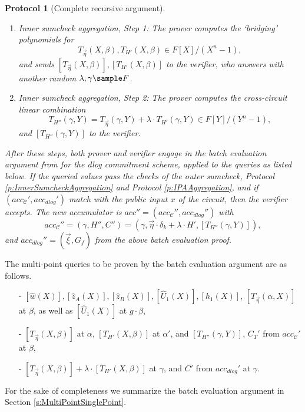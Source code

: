 \documentclass[10pt,article,oneside]{memoir}
\newtheorem{protocol}[]{Protocol}
\theoremstyle{definition}
\theoremstyle{remark}
\begin{document}
\begin{protocol}[Complete recursive argument]
\begin{enumerate}
\item
\textit{Inner sumcheck aggregation, Step 1}:
The prover computes the `bridging' polynomials for  
\[
T_{\vec\eta}(X,\beta), T_{H'}(X,\beta)\in F[X]/(X^n-1),
\]
and sends $[T_{\vec\eta}(X,\beta)], [T_{H'}(X, \beta)]$ to the verifier, who answers with another random $\lambda,\gamma\sample F$.
\item
\textit{Inner sumcheck aggregation, Step 2}:
The prover computes the cross-circuit linear combination
\[
T_{H''}(\gamma,Y) = T_{\vec\eta}(\gamma, Y) + \lambda \cdot  T_{H'}(\gamma, Y)\in F[Y]/(Y^n-1),
\]
and $[T_{H''}(\gamma,Y)]$ to the verifier.
\end{enumerate}
After these steps, both prover and verifier engage in the batch evaluation argument from \cite{HaloInfinite} for the dlog commitment scheme, applied to the queries as listed below.
If the queried values pass the checks of the outer sumcheck, Protocol \ref{p:InnerSumcheckAggregation} and Protocol \ref{p:IPAAggregation}, and if $(acc_{\mathcal C}',acc_{dlog}')$ match with the public input $x$ of the circuit, then the verifier accepts.
The new accumulator is $acc'' =(acc_\mathcal C'', acc_{dlog}'')$ with\footnotemark 
\[
acc_\mathcal C''=(\gamma,H'', C'') = (\gamma,  \vec\eta\cdot\delta_k + \lambda \cdot H', [T_{H''}(\gamma, Y)]) ,
\] 
and $acc_{dlog}''=(\vec\xi,G_f)$ from the above batch evaluation proof. 
\end{protocol}

The multi-point queries to be proven by the batch evaluation argument are as follows.
\begin{itemize}
\item[-] 
$[\hat w(X)], [\hat z_A(X)], [\hat z_B(X)], [\hat U_1(X)], [h_1(X)]$, $[T_{\vec\eta}(\alpha, X)]$ at $\beta$, as 
well as $[\hat U_1(X)]$ at $g\cdot \beta$,
\item[-]
$[T_{\vec\eta}(X,\beta)]$ at $\alpha$, $[T_{H'}(X,\beta)]$ at $\alpha'$,
and $[T_{H''}(\gamma, Y)]$, $C_T'$ from $acc_\mathcal C'$ at  $\beta$,
\item[-]
$[T_{\vec\eta}(X,\beta)]+\lambda\cdot [T_{H'}(X,\beta)]$ at $\gamma$, and 
$C'$ from $acc_{dlog}'$ at $\gamma$.
\end{itemize}
For the sake of completeness we summarize the batch evaluation argument in Section \ref{s:MultiPointSinglePoint}.
\end{document}
